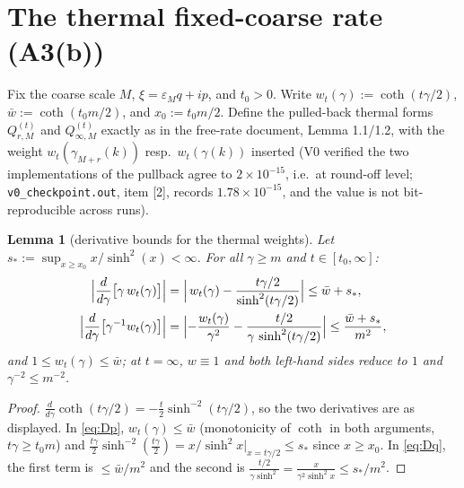\documentclass[11pt,a4paper]{article}
\theoremstyle{plain}
\newtheorem{lemma}[theorem]{Lemma}
\theoremstyle{definition}
\newcommand{\eps}{\varepsilon}
\DeclareMathOperator{\sh}{sinh}
\DeclareMathOperator{\cth}{coth}
\begin{document}
\section{The thermal fixed-coarse rate (A3(b))}\label{sec:rate}

Fix the coarse scale $M$, $\xi=\eps_Mq+ip$, and $t_0>0$. Write
$w_t(\gamma):=\cth(t\gamma/2)$, $\bar w:=\cth(t_0m/2)$, and
$x_0:=t_0m/2$. Define the pulled-back thermal forms $Q^{(t)}_{r,M}$ and
$Q^{(t)}_{\infty,M}$ exactly as in the free-rate document, Lemma 1.1/1.2, with
the weight $w_t(\gamma_{M+r}(k))$ resp.\ $w_t(\gamma(k))$ inserted (V0
verified the two implementations of the pullback agree to $2\times10^{-15}$,
i.e.\ at round-off level; \texttt{v0\_checkpoint.out}, item [2], records
$1.78\times10^{-15}$, and the value is not bit-reproducible across runs).

\begin{lemma}[derivative bounds for the thermal weights]\label{lem:wderiv}
Let $s_*:=\sup_{x\ge x_0}x/\sh^2(x)<\infty$. For all
$\gamma\ge m$ and $t\in[t_0,\infty]$:
\begin{align}
 \Bigl|\frac{d}{d\gamma}\bigl[\gamma\,w_t(\gamma)\bigr]\Bigr|
 &=\Bigl|\,w_t(\gamma)-\frac{t\gamma/2}{\sh^2(t\gamma/2)}\Bigr|
 \le\bar w+s_* ,
 \label{eq:Dp}\\
 \Bigl|\frac{d}{d\gamma}\bigl[\gamma^{-1}w_t(\gamma)\bigr]\Bigr|
 &=\Bigl|-\frac{w_t(\gamma)}{\gamma^2}
 -\frac{t/2}{\gamma\,\sh^2(t\gamma/2)}\Bigr|
 \le\frac{\bar w+s_*}{m^2} ,
 \label{eq:Dq}
\end{align}
and $1\le w_t(\gamma)\le\bar w$; at $t=\infty$, $w\equiv1$ and both
left-hand sides reduce to $1$ and $\gamma^{-2}\le m^{-2}$.
\end{lemma}

\begin{proof}
$\tfrac d{d\gamma}\cth(t\gamma/2)=-\tfrac t2\sh^{-2}(t\gamma/2)$, so the two
derivatives are as displayed. In \eqref{eq:Dp}, $w_t(\gamma)\le\bar w$
(monotonicity of $\cth$ in both arguments, $t\gamma\ge t_0m$) and
$\tfrac{t\gamma}2\sh^{-2}(\tfrac{t\gamma}2)=x/\sh^2x\big|_{x=t\gamma/2}\le
s_*$ since $x\ge x_0$. In \eqref{eq:Dq}, the first term is
$\le\bar w/m^2$ and the second is
$\tfrac{t/2}{\gamma\sh^2}=\tfrac{x}{\gamma^2\sh^2x}\le s_*/m^2$.
\end{proof}
\end{document}
